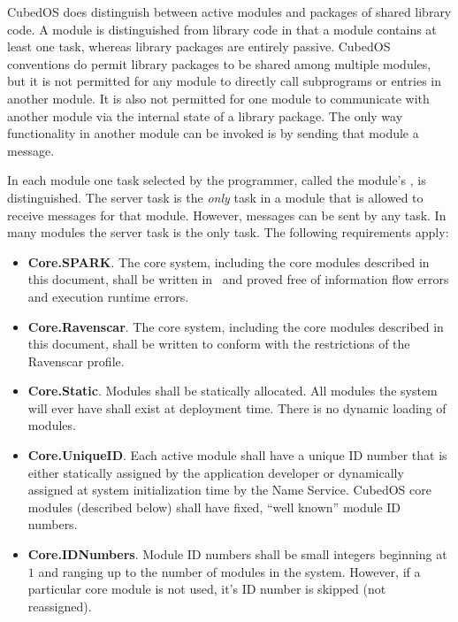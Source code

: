 CubedOS does distinguish between active modules and packages of shared library code. A module is
distinguished from library code in that a module contains at least one task, whereas library
packages are entirely passive. CubedOS conventions do permit library packages to be shared among
multiple modules, but it is not permitted for any module to directly call subprograms or entries
in another module. It is also not permitted for one module to communicate with another module
via the internal state of a library package.  The only way functionality in another module can be invoked is by sending that
module a message.

In each module one task selected by the programmer, called the module's ,
is distinguished. The server task is the \emph{only} task in a module that is allowed to receive
messages for that module. However, messages can be sent by any task. In many modules the server
task is the only task. The following requirements apply:

\begin{itemize}
\item \textbf{Core.SPARK}. The core system, including the core modules described in this
  document, shall be written in \SPARK\ and proved free of information flow errors and execution
  runtime errors.
\item \textbf{Core.Ravenscar}. The core system, including the core modules described in this
  document, shall be written to conform with the restrictions of the Ravenscar profile. 
\item \textbf{Core.Static}. Modules shall be statically allocated. All modules the system will
  ever have shall exist at deployment time. There is no dynamic loading of modules. 
\item \textbf{Core.UniqueID}. Each active module shall have a unique ID number that is either
  statically assigned by the application developer or dynamically assigned at system
  initialization time by the Name Service.  CubedOS core
  modules (described below) shall have fixed, ``well known'' module ID numbers.
\item \textbf{Core.IDNumbers}. Module ID numbers shall be small integers beginning at $1$ and
  ranging up to the number of modules in the system. However, if a particular core module is not
  used, it's ID number is skipped (not reassigned). 
\end{itemize}

